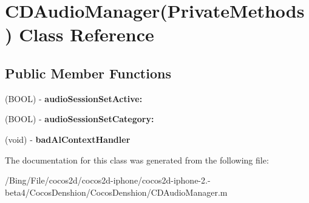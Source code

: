 \hypertarget{interface_c_d_audio_manager_07_private_methods_08}{\section{C\-D\-Audio\-Manager(Private\-Methods) Class Reference}
\label{interface_c_d_audio_manager_07_private_methods_08}
}
\subsection*{Public Member Functions}
\begin{DoxyCompactItemize}
\item 
\hypertarget{interface_c_d_audio_manager_07_private_methods_08_a4b56e335717210211452776f410fe663}{(B\-O\-O\-L) -\/ {\bfseries audio\-Session\-Set\-Active\-:}}\label{interface_c_d_audio_manager_07_private_methods_08_a4b56e335717210211452776f410fe663}

\item 
\hypertarget{interface_c_d_audio_manager_07_private_methods_08_a6f3477c3ea17cb909c974d915aa537ff}{(B\-O\-O\-L) -\/ {\bfseries audio\-Session\-Set\-Category\-:}}\label{interface_c_d_audio_manager_07_private_methods_08_a6f3477c3ea17cb909c974d915aa537ff}

\item 
\hypertarget{interface_c_d_audio_manager_07_private_methods_08_a95773df277cf1440a70017986eba5357}{(void) -\/ {\bfseries bad\-Al\-Context\-Handler}}\label{interface_c_d_audio_manager_07_private_methods_08_a95773df277cf1440a70017986eba5357}

\end{DoxyCompactItemize}


The documentation for this class was generated from the following file\-:\begin{DoxyCompactItemize}
\item 
/\-Bing/\-File/cocos2d/cocos2d-\/iphone/cocos2d-\/iphone-\/2.-\/beta4/\-Cocos\-Denshion/\-Cocos\-Denshion/C\-D\-Audio\-Manager.\-m\end{DoxyCompactItemize}
